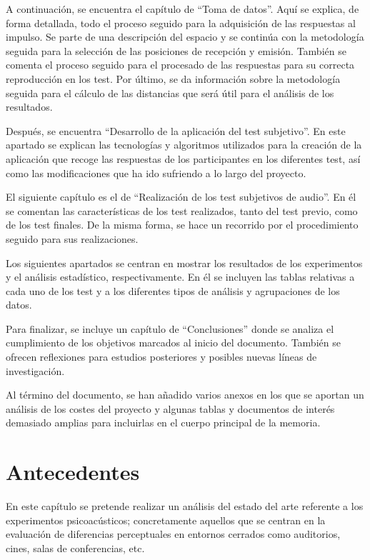 \documentclass[11pt,a4paper]{book}
\begin{document}
        A continuación, se encuentra el capítulo de ``Toma de datos''. Aquí se explica, de forma detallada, todo el proceso seguido para la adquisición de las respuestas al impulso. Se parte de una descripción del espacio y se continúa con la metodología seguida para la selección de las posiciones de recepción y emisión. También se comenta el proceso seguido para el procesado de las respuestas para su correcta reproducción en los test. Por último, se da información sobre la metodología seguida para el cálculo de las distancias que será útil para el análisis de los resultados.
        
        Después, se encuentra ``Desarrollo de la aplicación del test subjetivo''. En este apartado se explican las tecnologías y algoritmos utilizados para la creación de la aplicación que recoge las respuestas de los participantes en los diferentes test, así como las modificaciones que ha ido sufriendo a lo largo del proyecto.
        
        El siguiente capítulo es el de ``Realización de los test subjetivos de audio''. En él se comentan las características de los test realizados, tanto del test previo, como de los test finales. De la misma forma, se hace un recorrido por el procedimiento seguido para sus realizaciones.
        
        Los siguientes apartados se centran en mostrar los resultados de los experimentos y el análisis estadístico, respectivamente. En él se incluyen las tablas relativas a cada uno de los test y a los diferentes tipos de análisis y agrupaciones de los datos.
        
        Para finalizar, se incluye un capítulo de ``Conclusiones'' donde se analiza el cumplimiento de los objetivos marcados al inicio del documento. También se ofrecen reflexiones para estudios posteriores y posibles nuevas líneas de investigación.
        
        Al término del documento, se han añadido varios anexos en los que se aportan un análisis de los costes del proyecto y algunas tablas y documentos de interés demasiado amplias para incluirlas en el cuerpo principal de la memoria.

\chapter{Antecedentes}
    En este capítulo se pretende realizar un análisis del estado del arte referente a los experimentos psicoacústicos; concretamente aquellos que se centran en la evaluación de diferencias perceptuales en entornos cerrados como auditorios, cines, salas de conferencias, etc.
    
\end{document}
